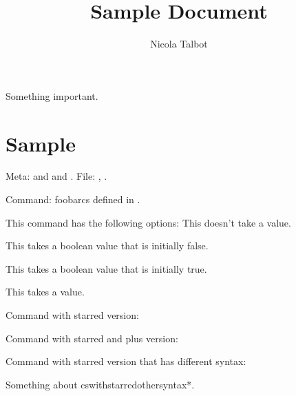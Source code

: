 \documentclass[titlepage=false,index=totoc,bibliography=totoc,
 fontsize=12pt,captions=tableheading]{scrreprt}
\title{Sample Document}
\author{Nicola Talbot}
\begin{document}
\maketitle

\begin{important}
Something important.
\end{important}

\frontmatter
\tableofcontents

\mainmatter
\chapter{Sample}

Meta:  and  and .
File: , 
. 

Command: \gls{foobarcs} defined in .


This command has the following options:
This doesn't take a value.

This takes a boolean value that is initially false.

This takes a boolean value that is initially true.

This takes a value.

Command with starred version:


Command with starred and plus version:


Command with starred version that has different syntax:


Something about \gls{cswithstarredothersyntax*}.

\printterms
\end{document}
